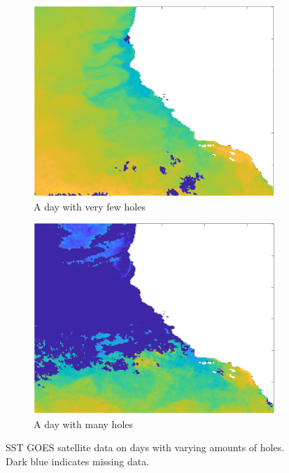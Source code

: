 \documentclass[11pt]{article}
\begin{document}
\begin{figure}[H]
	\centering
	\begin{subfigure}{3.2in}
		\includegraphics[width=\textwidth]{satellite_some_holes.png}
		\caption{A day with very few holes}
	\end{subfigure}
	\begin{subfigure}{3.2in}
		\includegraphics[width=\textwidth]{satellite_many_holes.png}
		\caption{A day with many holes}
	\end{subfigure}
    \caption{SST GOES satellite data on days with varying amounts of holes. Dark blue indicates missing data.}
    \label{fig:satellitesomeholes}    
    \label{fig:satellitemanyholes}
\end{figure}
\end{document}
